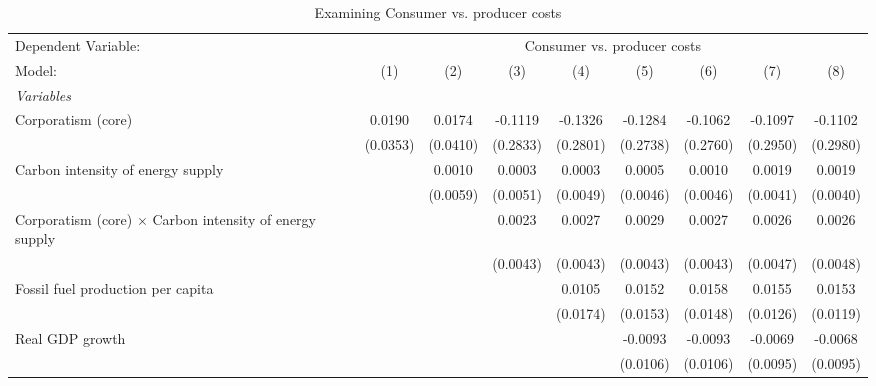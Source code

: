 
\begin{table}[htbp]
   \caption{Examining Consumer vs. producer costs}
   \centering
   \begin{tabular}{lcccccccc}
      \tabularnewline \midrule \midrule
      Dependent Variable: & \multicolumn{8}{c}{Consumer vs. producer costs}\\
      Model:                                                         & (1)      & (2)      & (3)      & (4)      & (5)      & (6)      & (7)      & (8)\\  
      \midrule
      \emph{Variables}\\
      Corporatism (core)                                             & 0.0190   & 0.0174   & -0.1119  & -0.1326  & -0.1284  & -0.1062  & -0.1097  & -0.1102\\   
                                                                     & (0.0353) & (0.0410) & (0.2833) & (0.2801) & (0.2738) & (0.2760) & (0.2950) & (0.2980)\\   
      Carbon intensity of energy supply                              &          & 0.0010   & 0.0003   & 0.0003   & 0.0005   & 0.0010   & 0.0019   & 0.0019\\   
                                                                     &          & (0.0059) & (0.0051) & (0.0049) & (0.0046) & (0.0046) & (0.0041) & (0.0040)\\   
      Corporatism (core) $\times$ Carbon intensity of energy supply  &          &          & 0.0023   & 0.0027   & 0.0029   & 0.0027   & 0.0026   & 0.0026\\   
                                                                     &          &          & (0.0043) & (0.0043) & (0.0043) & (0.0043) & (0.0047) & (0.0048)\\   
      Fossil fuel production per capita                              &          &          &          & 0.0105   & 0.0152   & 0.0158   & 0.0155   & 0.0153\\   
                                                                     &          &          &          & (0.0174) & (0.0153) & (0.0148) & (0.0126) & (0.0119)\\   
      Real GDP growth                                                &          &          &          &          & -0.0093  & -0.0093  & -0.0069  & -0.0068\\   
                                                                     &          &          &          &          & (0.0106) & (0.0106) & (0.0095) & (0.0095)\\   

\end{tabular}
\end{table}

